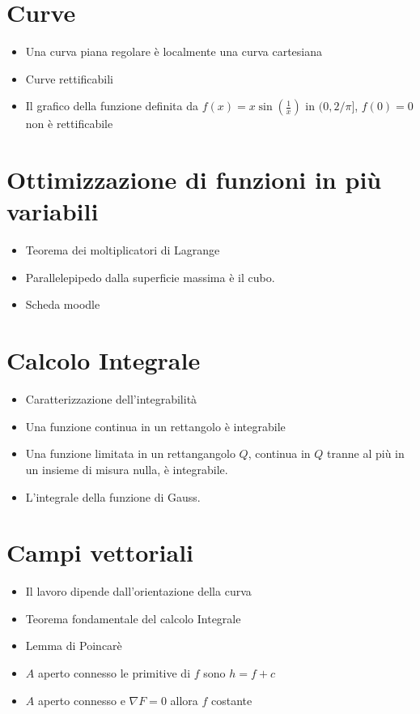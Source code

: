 \documentclass[a4paper]{book}
\numberwithin{equation}{section}
\theoremstyle{plain}
\theoremstyle{definition}
\theoremstyle{remark}
\theoremstyle{example}
\begin{document}
	\section{Curve}
	\begin{itemize}
		\item Una curva piana regolare è localmente una curva cartesiana
		\item Curve rettificabili
		\item Il grafico della funzione definita da $f(x) = x\sin(\frac{1}{x})$ in $(0,2/\pi]$, $f(0) = 0$ non è rettificabile
	\end{itemize}


	\section{Ottimizzazione di funzioni in più variabili}
	\begin{itemize}
		\item Teorema dei moltiplicatori di Lagrange
		\item Parallelepipedo dalla superficie massima è il cubo.
		\item Scheda moodle
	\end{itemize}

	\section{Calcolo Integrale}
	\begin{itemize}
		\item Caratterizzazione dell'integrabilità
		\item Una funzione continua in un rettangolo è integrabile
		\item Una funzione limitata in un rettangangolo $Q$, continua in $Q$ tranne al più in un insieme di misura nulla, è integrabile.
		\item L'integrale della funzione di Gauss.
	\end{itemize}

	\section{Campi vettoriali}
	\begin{itemize}
		\item Il lavoro dipende dall'orientazione della curva
		\item Teorema fondamentale del calcolo Integrale
		\item Lemma di Poincarè
		\item $A$ aperto connesso le primitive di $f$ sono $h=f+c$
		\item $A$ aperto connesso e $\nabla F = 0$ allora $f$ costante
	\end{itemize}
\end{document}
